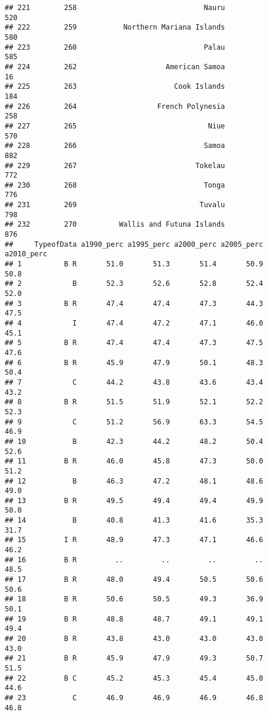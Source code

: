 \documentclass[]{article}
\begin{document}
\begin{verbatim}
## 221        258                              Nauru                520
## 222        259           Northern Mariana Islands                580
## 223        260                              Palau                585
## 224        262                     American Samoa                 16
## 225        263                       Cook Islands                184
## 226        264                   French Polynesia                258
## 227        265                               Niue                570
## 228        266                              Samoa                882
## 229        267                            Tokelau                772
## 230        268                              Tonga                776
## 231        269                             Tuvalu                798
## 232        270          Wallis and Futuna Islands                876
##     TypeofData a1990_perc a1995_perc a2000_perc a2005_perc a2010_perc
## 1          B R       51.0       51.3       51.4       50.9       50.8
## 2            B       52.3       52.6       52.8       52.4       52.0
## 3          B R       47.4       47.4       47.3       44.3       47.5
## 4            I       47.4       47.2       47.1       46.0       45.1
## 5          B R       47.4       47.4       47.3       47.5       47.6
## 6          B R       45.9       47.9       50.1       48.3       50.4
## 7            C       44.2       43.8       43.6       43.4       43.2
## 8          B R       51.5       51.9       52.1       52.2       52.3
## 9            C       51.2       56.9       63.3       54.5       46.9
## 10           B       42.3       44.2       48.2       50.4       52.6
## 11         B R       46.0       45.8       47.3       50.0       51.2
## 12           B       46.3       47.2       48.1       48.6       49.0
## 13         B R       49.5       49.4       49.4       49.9       50.0
## 14           B       40.8       41.3       41.6       35.3       31.7
## 15         I R       48.9       47.3       47.1       46.6       46.2
## 16         B R         ..         ..         ..         ..       48.5
## 17         B R       48.0       49.4       50.5       50.6       50.6
## 18         B R       50.6       50.5       49.3       36.9       50.1
## 19         B R       48.8       48.7       49.1       49.1       49.4
## 20         B R       43.8       43.0       43.0       43.0       43.0
## 21         B R       45.9       47.9       49.3       50.7       51.5
## 22         B C       45.2       45.3       45.4       45.0       44.6
## 23           C       46.9       46.9       46.9       46.8       46.8

\end{verbatim}
\end{document}

